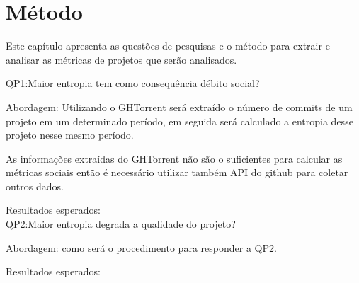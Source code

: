 \chapter{Método}
Este capítulo apresenta as questões de pesquisas e o método para extrair e analisar as métricas de projetos que serão analisados.

QP1:Maior entropia tem como consequência débito social?

Abordagem: Utilizando o GHTorrent será extraído o número de commits de um projeto em um determinado período, em seguida será calculado a entropia desse projeto nesse mesmo período.

As informações extraídas do GHTorrent não são o suficientes para calcular as métricas sociais então é necessário utilizar também API do github para coletar outros dados.

Resultados esperados: \\

QP2:Maior entropia degrada a qualidade do projeto?

Abordagem: como será o procedimento para responder a QP2.

Resultados esperados: 